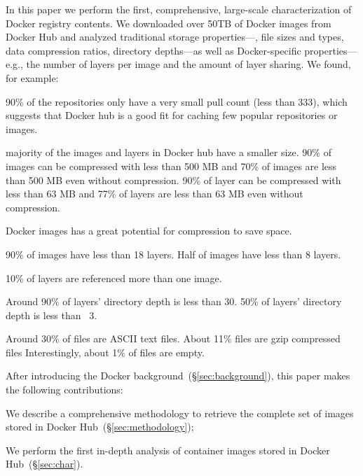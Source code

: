 In this paper we perform the first, comprehensive, large-scale characterization of
Docker registry contents.
%
We downloaded over 50TB of Docker images from Docker Hub and analyzed
traditional storage properties---\eg, file sizes and types, data compression
ratios, directory depths---as well as Docker-specific properties---e.g., the number
of layers per image and the amount of layer sharing.
%
%
We found, for example:
\begin{compactenumerate}
	\item 90\% of the repositories only have a very small pull count (less than 333), which suggests that Docker hub is a good fit for caching few popular repositories or images.
	\item majority of the images and layers in Docker hub have a smaller size. 90\% of images can be compressed with less than 500 MB and 70\% of images are less than 500 MB even without compression. 90\% of layer can be compressed with less than 63 MB and 77\% of layers are less than 63 MB even without compression.
	\item Docker images has a great potential for compression to save space.
	\item 90\% of images have less than 18 layers. Half of images have less than 8 layers. 
	\item 10\% of layers are referenced more than one image.
	\item Around 90\% of layers' directory depth is less than 30. 50\% of layers' directory depth is less than ~3.
	\item Around 30\% of files are ASCII text files. 
	About 11\% files are gzip compressed files 
	Interestingly, about 1\% of files are empty. 
\end{compactenumerate}
%

%

After introducing the Docker background~(\S\ref{sec:background}),
this paper makes the following contributions:
\begin{compactenumerate}
  \item We describe a comprehensive methodology to retrieve the complete set of
  	images stored in Docker Hub~(\S\ref{sec:methodology});
  \item We perform the first in-depth analysis of container images stored in
    Docker Hub~(\S\ref{sec:char}).
\end{compactenumerate}

